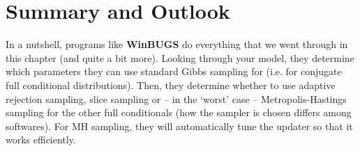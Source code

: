 
\section{Summary and Outlook}

In a nutshell, programs like {\bf WinBUGS} do everything that we 
went through in this chapter (and quite a bit more). Looking through 
your model, they determine which parameters they can use standard 
Gibbs sampling for (i.e. for conjugate full conditional distributions). 
Then, they determine whether to use adaptive 
rejection sampling, slice sampling or -- in the `worst' case -- 
Metropolis-Hastings sampling for the other full conditionals (how the sampler is chosen differs among softwares). For MH sampling, they will 
automatically tune the updater so that it works efficiently.


